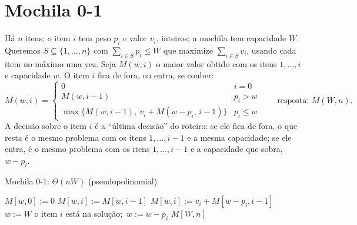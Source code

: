 \section{Mochila 0-1}\label{sec:mochila}
Há $n$ itens; o item $i$ tem peso $p_i$ e valor $v_i$, inteiros; a mochila tem capacidade $W$. Queremos $S\subseteq\{1,\dots,n\}$ com $\sum_{i\in S}p_i\le W$ que maximize $\sum_{i\in S}v_i$, usando cada item no máximo uma vez. Seja $M(w,i)$ o maior valor obtido com os itens $1,\dots,i$ e capacidade $w$. O item $i$ fica de fora, ou entra, se couber:
\[
M(w,i)=\begin{cases}0 & i=0\\ M(w,i-1) & p_i>w\\ \max\{M(w,i-1),\ v_i+M(w-p_i,\,i-1)\} & p_i\le w\end{cases}\qquad\text{resposta: }M(W,n).
\]
A decisão sobre o item $i$ é a ``última decisão'' do roteiro: se ele fica de fora, o que resta é o mesmo problema com os itens $1,\dots,i-1$ e a mesma capacidade; se ele entra, é o mesmo problema com os itens $1,\dots,i-1$ e a capacidade que sobra, $w-p_i$.
\begin{pseudo}{Mochila 0-1: $\Theta(nW)$ (pseudopolinomial)}
\begin{algorithmic}
   \State $M[w,0]:=0$ \EndFor
      \State $M[w,i]:=M[w,i-1]$
       \State $M[w,i]:=v_i+M[w-p_i,i-1]$ \EndIf
    \EndFor
  \EndFor
  \State $w:=W$ 
     \State o item $i$ está na solução;\ $w:=w-p_i$ \EndIf
  \EndFor
  \State \Return $M[W,n]$
\EndFunction
\end{algorithmic}
\end{pseudo}
